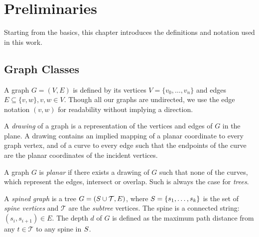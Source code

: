 
\chapter{Preliminaries}


Starting from the basics, this chapter introduces the definitions and notation used in this work.

\section{Graph Classes}

A graph $G = (V, E)$ is defined by its vertices $V = \{ v_0, \ldots , v_n \}$ and edges $E \subseteq \{ v, w \}, v, w \in V$. Though all our graphs are undirected, we use the edge notation $(v, w)$ for readability without implying a direction.

A \emph{drawing} of a graph is a representation of the vertices and edges of $G$ in the plane. A drawing contains an implied mapping of a planar coordinate to every graph vertex, and of a curve to every edge such that the endpoints of the curve are the planar coordinates of the incident vertices.

A graph $G$ is \emph{planar} if there exists a drawing of $G$ such that none of the curves, which represent the edges, intersect or overlap. Such is always the case for \emph{trees}.

A \emph{spined graph} is a tree $G = (S \cup \mathcal T, E)$, where $S = \{ s_1, \ldots, s_k \}$ is the set of \emph{spine vertices} and $\mathcal T$ are the \emph{subtree} vertices. The spine is a connected string: $(s_i, s_{i+1}) \in E$. The depth $d$ of $G$ is defined as the maximum path distance from any $t \in \mathcal T$ to any spine in $S$.

